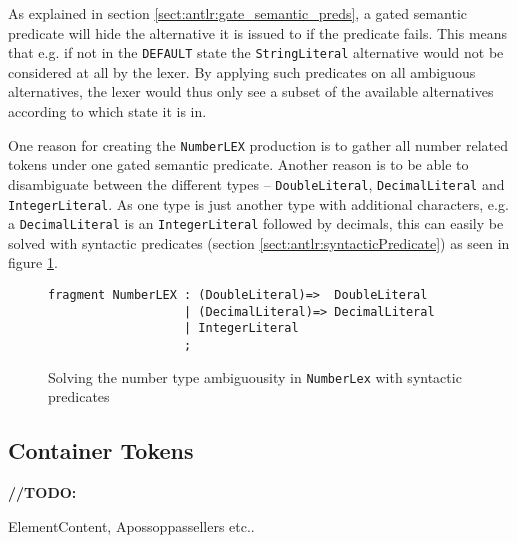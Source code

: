 As explained in section \ref{sect:antlr:gate_semantic_preds}, a gated semantic predicate will hide the alternative it is issued to if the predicate fails. This means that e.g. if not in the \verb!DEFAULT! state the \verb!StringLiteral! alternative would not be considered at all by the lexer. By applying such predicates on all ambiguous alternatives, the lexer would thus only see a subset of the available alternatives according to which state it is in.

One reason for creating the \verb!NumberLEX! production is to gather all number related tokens under one gated semantic predicate. Another reason is to be able to disambiguate between the different types -- \verb!DoubleLiteral!, \verb!DecimalLiteral! and \verb!IntegerLiteral!. As one type is just another type with additional characters, e.g. a \verb!DecimalLiteral! is an \verb!IntegerLiteral! followed by decimals, this can easily be solved with syntactic predicates (section \ref{sect:antlr:syntacticPredicate}) as seen in figure \ref{fig:numberLex}.

\begin{figure}[h!]
\begin{verbatim}
fragment NumberLEX : (DoubleLiteral)=>	DoubleLiteral
                   | (DecimalLiteral)=> DecimalLiteral
                   | IntegerLiteral
                   ;
\end{verbatim}
\caption[Solving the number type ambiguousity]{Solving the number type ambiguousity in \texttt{NumberLex} with syntactic predicates}
\label{fig:numberLex}
\end{figure}

\subsection{Container Tokens}
\label{sect:rewriteGrammar:containerTokens}

\textbf{\LARGE //TODO:} 

ElementContent, Apossoppassellers etc..

